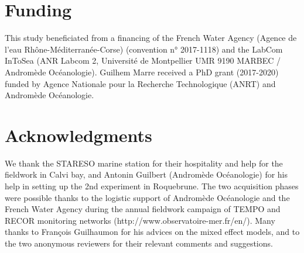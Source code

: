 \section{Funding}\label{chapitre1_8}
This study beneficiated from a financing of the French Water Agency (Agence de l’eau Rhône-Méditerranée-Corse) (convention n° 2017-1118) and the LabCom InToSea (ANR Labcom 2, Université de Montpellier UMR 9190 MARBEC / Andromède Océanologie). Guilhem Marre received a PhD grant (2017-2020) funded by Agence Nationale pour la Recherche Technologique (ANRT) and Andromède Océanologie.

\section{Acknowledgments}\label{chapitre1_9}
We thank the STARESO marine station for their hospitality and help for the fieldwork in Calvi bay, and Antonin Guilbert (Andromède Océanologie) for his help in setting up the 2nd experiment in Roquebrune. The two acquisition phases were possible thanks to the logistic support of Andromède Océanologie and the French Water Agency during the annual fieldwork campaign of TEMPO and RECOR monitoring networks (http://www.observatoire-mer.fr/en/). Many thanks to François Guilhaumon for his advices on the mixed effect models, and to the two anonymous reviewers for their relevant comments and suggestions.